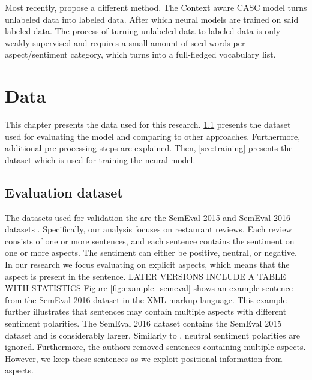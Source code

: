 \documentclass[american, oneside]{ecsgdp}
\begin{document}
Most recently, \textcite{Kumar2021CASC} propose a different method. The Context aware CASC model turns unlabeled data into labeled data. After which neural models are trained on said labeled data. The process of turning unlabeled data to labeled data is only weakly-supervised and requires a small amount of seed words per aspect/sentiment category, which turns into a full-fledged vocabulary list. 

\chapter{Data} \label{chap:data}
This chapter presents the data used for this research. \cref{sec:evaluation} presents the dataset used for evaluating the model and comparing to other approaches. Furthermore, additional pre-processing steps are explained. Then, \cref{sec:training} presents the dataset which is used for training the neural model.

\section{Evaluation dataset} \label{sec:evaluation}
The datasets used for validation the are the SemEval 2015 and SemEval 2016 datasets \parencite{Pontiki2015SemEval, Pontiki2016SemEval}. Specifically, our analysis focuses on restaurant reviews. Each review consists of one or more sentences, and each sentence contains the sentiment on one or more aspects. The sentiment can either be positive, neutral, or negative. In our research we focus evaluating on explicit aspects, which means that the aspect is present in the sentence. 
LATER VERSIONS INCLUDE A TABLE WITH STATISTICS %
Figure \ref{fig:example_semeval} shows an example sentence from the SemEval 2016 dataset in the XML markup language. This example further illustrates that sentences may contain multiple aspects with different sentiment polarities.
The SemEval 2016 dataset contains the SemEval 2015 dataset and is considerably larger. Similarly to \textcite{Huang2020JASen, Kumar2021CASC}, neutral sentiment polarities are ignored. Furthermore, the authors removed sentences containing multiple aspects. However, we keep these sentences as we exploit positional information from aspects.
\end{document}
